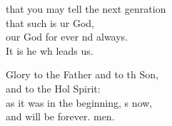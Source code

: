\begin{psalmverse}
\begin{patverse}
that you may tell the next genration\Med\\
that such is ur God,\\
our God for ever nd always.\Med\\
It is he wh leads us.

Glory to the Father and to th Son,\Med\\
and to the Hol Spirit:\\
as it was in the beginning, \pointup{\i}s now,\Med\\
and will be forever. men. 
  \end{patverse}
\end{psalmverse}

